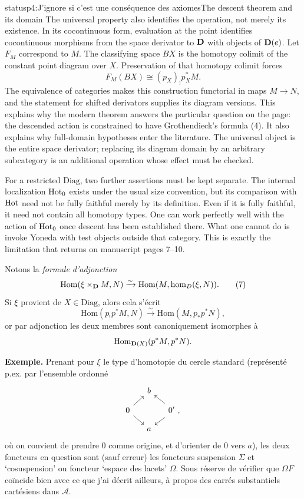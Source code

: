 \begin{dcomment}{status}{p4:J'ignore si c'est une conséquence des axiomes}{The descent theorem and its domain}
The universal property also identifies the operation, not merely its existence. In its cocontinuous form, evaluation at the point identifies cocontinuous morphisms from the space derivator to \(\mathbf{D}\) with objects of \(\mathbf{D}(e)\). Let \(F_M\) correspond to \(M\). The classifying space \(B X\) is the homotopy colimit of the constant point diagram over \(X\). Preservation of that homotopy colimit forces
\[
 F_M(B X)\cong (p_X)_!p_X^*M.
\]
The equivalence of categories makes this construction functorial in maps \(M\to N\), and the statement for shifted derivators supplies its diagram versions. This explains why the modern theorem answers the particular question on the page: the descended action is constrained to have Grothendieck's formula (4). It also explains why full-domain hypotheses enter the literature. The universal object is the entire space derivator; replacing its diagram domain by an arbitrary subcategory is an additional operation whose effect must be checked.

For a restricted \(\mathrm{Diag}\), two further assertions must be kept separate. The internal localization \(\mathrm{Hot}_0\) exists under the usual size convention, but its comparison with \(\mathrm{Hot}\) need not be fully faithful merely by its definition. Even if it is fully faithful, it need not contain all homotopy types. One can work perfectly well with the action of \(\mathrm{Hot}_0\) once descent has been established there. What one cannot do is invoke Yoneda with test objects outside that category. This is exactly the limitation that returns on manuscript pages 7--10.
\end{dcomment}


Notons la \textit{formule d'adjonction}
\[
\mathrm{Hom}(\xi \times_{\D} M, N) \xrightarrow{\sim} \mathrm{Hom}(M, \hm_D(\xi, N)).
\tag*{(7)}
\] %
Si $\xi$ provient de $X \in \mathrm{Diag}$, alors cela s'écrit
\[
\mathrm{Hom}(p_!p^*M, N) \xrightarrow{\sim} \mathrm{Hom}(M, p_*p^*N),
\tag*{(8)}
\]
or par adjonction les deux membres sont canoniquement isomorphes à
\[
\mathrm{Hom}_{\mathbf{D}(X)}(p^*M, p^*N).
\]

\textbf{Exemple.} Prenant pour $\xi$ le type d'homotopie du cercle standard (représenté p.ex. par l'ensemble ordonné
\[
\begin{tikzcd}[row sep=small, column sep=small]
 & b & \\
0 \arrow[ur] \arrow[dr] & & 0' \arrow[ul] \arrow[dl] \ , \\
 & a &
\end{tikzcd}
\]
où on convient de prendre 0 comme origine, et d'orienter de 0 vers $a$), les deux foncteurs en question sont (sauf erreur) les foncteurs suspension $\Sigma$ et `cosuspension' ou foncteur `espace des lacets' $\Omega$. Sous réserve de vérifier que $\Omega F$ coïncide bien avec ce que j'ai décrit ailleurs, à propos des carrés substantiels cartésiens dans $\mathcal{A}$.

